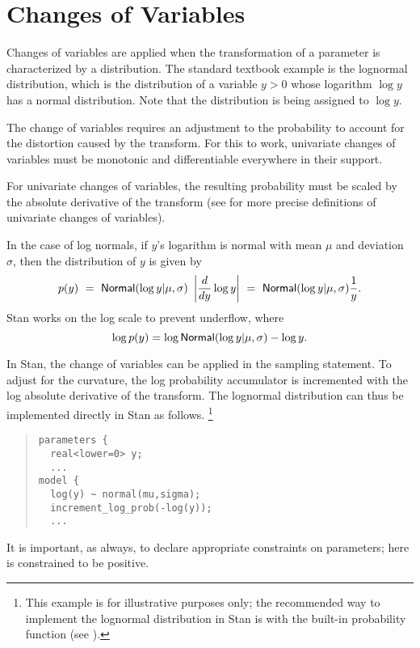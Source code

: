 \section{Changes of Variables}

Changes of variables are applied when the transformation of a
parameter is characterized by a distribution.  The standard textbook
example is the lognormal distribution, which is the distribution of a
variable $y > 0$ whose logarithm $\log y$ has a normal distribution.
Note that the distribution is being assigned to $\log y$. 

The change of variables requires an adjustment to the probability to
account for the distortion caused by the transform.  For this to work,
univariate changes of variables must be monotonic and differentiable
everywhere in their support.

For univariate changes of variables, the resulting probability must be
scaled by the absolute derivative of the transform (see
 for more precise definitions of
univariate changes of variables).

In the case of log normals, if $y$'s logarithm is normal with mean
$\mu$ and deviation $\sigma$, then the distribution of $y$ is given by
\[
p(y) 
\ = \
\mbox{\sf Normal}(\log y| \mu, \sigma) \  \left| \frac{d}{dy} \log y \right|
\ = \
\mbox{\sf Normal}(\log y| \mu, \sigma) \frac{1}{y}.
\]
Stan works on the log scale to prevent underflow, where
\[
\log p(y) 
=
\log \mbox{\sf Normal}(\log y| \mu, \sigma)
- \log y.
\]

In Stan, the change of variables can be applied in the sampling
statement.  To adjust for the curvature, the log probability
accumulator is incremented with the log absolute derivative of the
transform.  The lognormal distribution can thus be implemented
directly in Stan as follows.%
%
\footnote{This example is for illustrative purposes only; the
  recommended way to implement the lognormal distribution in Stan is
  with the built-in \code{lognormal} probability function (see ).}
%
\begin{quote}
\begin{Verbatim}[fontsize=\small]
parameters {
  real<lower=0> y;
  ...
model {
  log(y) ~ normal(mu,sigma);
  increment_log_prob(-log(y));
  ...
\end{Verbatim}
\end{quote}
%
It is important, as always, to declare appropriate constraints on
parameters;  here  is constrained to be positive. 

